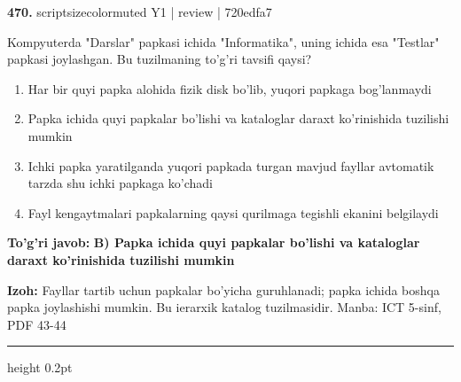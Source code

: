 \documentclass[10pt,a4paper]{article}
\begin{document}
{\bfseries\sffamily\color{ink} 470.} {scriptsizecolor{muted} Y1 | review | 720edfa7}
\par
Kompyuterda "Darslar" papkasi ichida "Informatika", uning ichida esa "Testlar" papkasi joylashgan. Bu tuzilmaning to'g'ri tavsifi qaysi?
\begin{enumerate}[label=\Alph*),leftmargin=9mm]
\item Har bir quyi papka alohida fizik disk bo'lib, yuqori papkaga bog'lanmaydi
\item Papka ichida quyi papkalar bo'lishi va kataloglar daraxt ko'rinishida tuzilishi mumkin
\item Ichki papka yaratilganda yuqori papkada turgan mavjud fayllar avtomatik tarzda shu ichki papkaga ko'chadi
\item Fayl kengaytmalari papkalarning qaysi qurilmaga tegishli ekanini belgilaydi
\end{enumerate}
\begin{tcolorbox}[enhanced,breakable,colback=teal!4,colframe=teal!60!black,boxrule=0.45pt,arc=1.2mm,left=2.7mm,right=2.7mm,top=1.8mm,bottom=1.8mm,before skip=2mm,after skip=2mm]
{\bfseries\sffamily\color{teal}To'g'ri javob:} \textbf{B) Papka ichida quyi papkalar bo'lishi va kataloglar daraxt ko'rinishida tuzilishi mumkin}
\par\smallskip
{\bfseries Izoh:} Fayllar tartib uchun papkalar bo'yicha guruhlanadi; papka ichida boshqa papka joylashishi mumkin. Bu ierarxik katalog tuzilmasidir. Manba: ICT 5-sinf, PDF 43-44
\end{tcolorbox}
\vspace{2mm}\hrule height 0.2pt\vspace{3mm}
\end{document}
